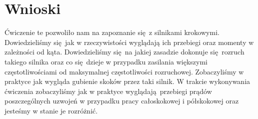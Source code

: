 \documentclass[a4paper, 12pt]{article}
\begin{document}
	\section{Wnioski}
		Ćwiczenie te pozwoliło nam na zapoznanie się z silnikami krokowymi. Dowiedzieliśmy się jak w rzeczywistości wyglądają ich przebiegi oraz momenty w zależności od kąta.
		\newline 
		\newline 
		Dowiedzieliśmy się na jakiej zasadzie dokonuje się rozruch takiego silnika oraz co się dzieje w przypadku zasilania większymi częstotliwościami od maksymalnej częstotliwości rozruchowej. Zobaczyliśmy w praktyce jak wygląda gubienie skoków przez taki silnik.
		\newline 
		\newline 
		W trakcie wykonywania ćwiczenia zobaczyliśmy jak w praktyce wyglądają przebiegi prądów poszczególnych uzwojeń w przypadku pracy całoskokowej i półskokowej oraz jesteśmy w stanie je rozróżnić.
\end{document}
